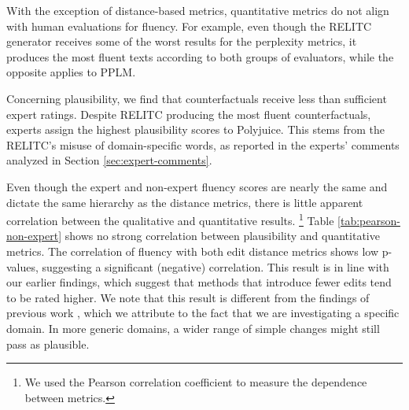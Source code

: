 \documentclass[11pt]{article}
\begin{document}
\begin{table*}[!ht]
    \centering
    \caption{Pearson correlation coefficients and $p$-values between the quantitative and qualitative metric results.}
    \label{tab:pearson-non-expert}
\end{table*}

With the exception of distance-based metrics, quantitative metrics do not align with human evaluations for fluency. For example, even though the RELITC generator receives some of the worst results for the perplexity metrics, it produces the most fluent texts according to both groups of evaluators, while the opposite applies to PPLM.

Concerning plausibility, we find that counterfactuals receive less than sufficient expert ratings. Despite RELITC producing the most fluent counterfactuals, experts assign the highest plausibility scores to Polyjuice. This stems from the RELITC's misuse of domain-specific words, as reported in the experts' comments analyzed in Section \ref{sec:expert-comments}.

Even though the expert and non-expert fluency scores are nearly the same and dictate the same hierarchy as the distance metrics, there is little apparent correlation between the qualitative and quantitative results. 
\footnote{We used the Pearson correlation coefficient to measure the dependence between metrics.} Table \ref{tab:pearson-non-expert} shows no strong correlation between plausibility and quantitative metrics. The correlation of fluency with both edit distance metrics shows low p-values, suggesting a significant (negative) correlation. This result is in line with our earlier findings, which suggest that methods that introduce fewer edits tend to be rated higher. We note that this result is different from the findings of previous work \cite{nguyen_ceval_2024}, which we attribute to the fact that we are investigating a specific domain. In more generic domains, a wider range of simple changes might still pass as plausible.
\end{document}
